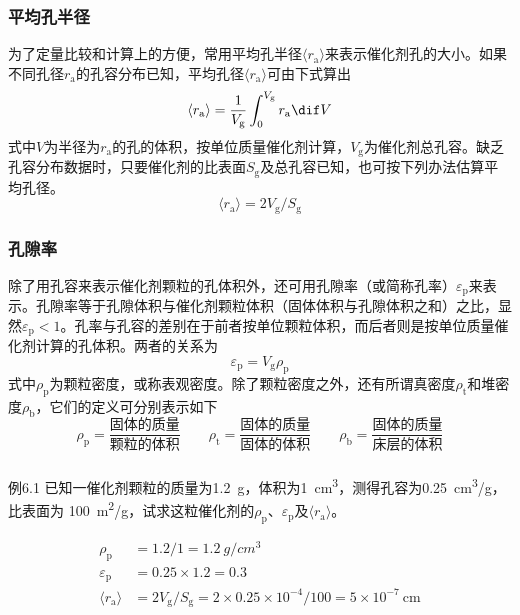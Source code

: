 \documentclass[dvipsnames, svgnames, x11names]{beamer}
\begin{document}
\begin{frame}
    \frametitle{平均孔半径}

    为了定量比较和计算上的方便，常用平均孔半径$\langle r_\mathrm{a} \rangle$来表示催化剂孔的大小。如果不同孔径$r_\mathrm{a}$的孔容分布已知，平均孔径$\langle r_\mathrm{a} \rangle$可由下式算出
    \[
        \langle r_\mathrm{a} \rangle = \frac{1}{V_\mathrm{g}} \int_0^{V_\mathrm{g}} r_\mathrm{a} \dif V
    \]
    式中$V$为半径为$r_\mathrm{a}$的孔的体积，按单位质量催化剂计算，$V_\mathrm{g}$为催化剂总孔容。缺乏孔容分布数据时，只要催化剂的比表面$S_\mathrm{g}$及总孔容已知，也可按下列办法估算平均孔径。
    \[
        \langle r_\mathrm{a} \rangle = 2V_\mathrm{g}/S_\mathrm{g}
    \]

\end{frame}


\begin{frame}
    \frametitle{孔隙率}

    除了用孔容来表示催化剂颗粒的孔体积外，还可用孔隙率（或简称孔率）$\varepsilon_\mathrm{p}$来表示。孔隙率等于孔隙体积与催化剂颗粒体积（固体体积与孔隙体积之和）之比，显然$\varepsilon_\mathrm{p} < 1$。孔率与孔容的差别在于前者按单位颗粒体积，而后者则是按单位质量催化剂计算的孔体积。两者的关系为
    \[
        \varepsilon_\mathrm{p} = V_\mathrm{g} \rho_\mathrm{p}
    \]
    式中$\rho_\mathrm{p}$为颗粒密度，或称表观密度。除了颗粒密度之外，还有所谓真密度$\rho_\mathrm{t}$和堆密度$\rho_\mathrm{b}$，它们的定义可分别表示如下
    \[
        \rho_\mathrm{p} = \frac{\text{固体的质量}}{\text{颗粒的体积}} \qquad \rho_\mathrm{t} = \frac{\text{固体的质量}}{\text{固体的体积}} \qquad \rho_\mathrm{b} = \frac{\text{固体的质量}}{\text{床层的体积}}
    \]

\end{frame}


\begin{frame}[t]
    \frametitle{}

    \begin{block}{例6.1}
        已知一催化剂颗粒的质量为\SI{1.2}{g}，体积为\SI{1}{cm^3}，测得孔容为\SI{0.25}{cm^3/g}，比表面为 \SI{100}{m^2/g}，试求这粒催化剂的$\rho_\mathrm{p}$、$\varepsilon_\mathrm{p}$及$\langle r_\mathrm{a} \rangle$。
    \end{block}
    \pause
    \[
        \begin{aligned}
            \rho_\mathrm{p} &= 1.2/1 = 1.2 \ \si{g/cm^{3}} \\
            \varepsilon_\mathrm{p} &= 0.25\times 1.2 = 0.3 \\
            \langle r_\mathrm{a} \rangle &= 2V_\mathrm{g}/S_\mathrm{g} = 2\times 0.25\times 10^{-4}/100  = 5\times 10^{-7} \ \mathrm{cm}
        \end{aligned}
    \]
\end{frame}
\end{document}
